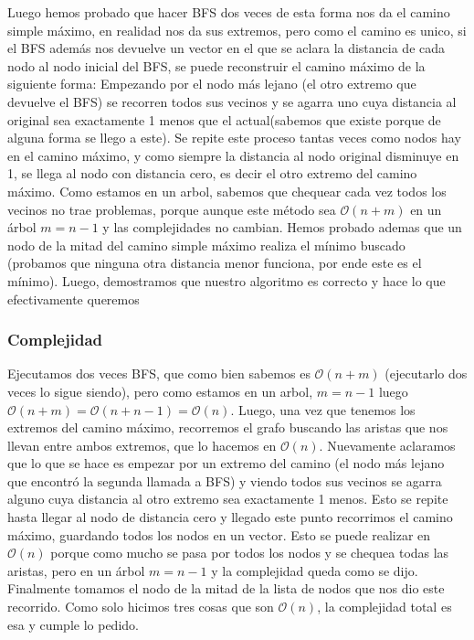\documentclass[A4paper,oneside,fleqn,11pt]{article}
\theoremstyle{definition}
\begin{document}
Luego hemos probado que hacer BFS dos veces de esta forma nos da el camino simple máximo, en realidad nos da sus extremos, pero como el camino es unico, si el BFS además nos devuelve un vector en el que se aclara la distancia de cada nodo al nodo inicial del BFS, se puede reconstruir el camino máximo de la siguiente forma: Empezando por el nodo más lejano (el otro extremo que devuelve el BFS) se recorren todos sus vecinos y se agarra uno cuya distancia al original sea exactamente 1 menos que el actual(sabemos que existe porque de alguna forma se llego a este). Se repite este proceso tantas veces como nodos hay en el camino máximo, y como siempre la distancia al nodo original disminuye en 1, se llega al nodo con distancia cero, es decir el otro extremo del camino máximo. Como estamos en un arbol, sabemos que chequear cada vez todos los vecinos no trae problemas, porque aunque este método sea $\mathcal{O} (n+m)$ en un árbol $m=n-1$ y las complejidades no cambian. Hemos probado ademas que un nodo de la mitad del camino simple máximo realiza el mínimo buscado (probamos que ninguna otra distancia menor funciona, por ende este es el mínimo). Luego, demostramos que nuestro algoritmo es correcto y hace lo que efectivamente queremos

\subsubsection{Complejidad}

Ejecutamos dos veces BFS, que como bien sabemos es $\mathcal{O} (n+m)$ (ejecutarlo dos veces lo sigue siendo), pero como estamos en un arbol, $m=n-1$ luego $\mathcal{O} (n+m) =\mathcal{O} (n+n-1)=\mathcal{O} (n)$. Luego, una vez que tenemos los extremos del camino máximo, recorremos el grafo buscando las aristas que nos llevan entre ambos extremos, que lo hacemos en $\mathcal{O} (n)$. Nuevamente aclaramos que lo que se hace es empezar por un extremo del camino (el nodo más lejano que encontró la segunda llamada a BFS) y viendo todos sus vecinos se agarra alguno cuya distancia al otro extremo sea exactamente 1 menos. Esto se repite hasta llegar al nodo de distancia cero y llegado este punto recorrimos el camino máximo, guardando todos los nodos en un vector. Esto se puede realizar en $\mathcal{O} (n)$ porque como mucho se pasa por todos los nodos y se chequea todas las aristas, pero en un árbol $m=n-1$ y la complejidad queda como se dijo. Finalmente tomamos el nodo de la mitad de la lista de nodos que nos dio este recorrido. Como solo hicimos tres cosas que son $\mathcal{O} (n)$, la complejidad total es esa y cumple lo pedido.
\end{document}
